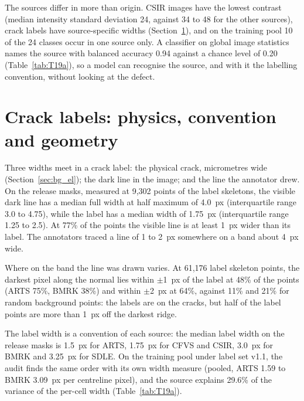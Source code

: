 The sources differ in more than origin. CSIR images have the lowest contrast (median intensity standard deviation 24,
against 34 to 48 for the other sources), crack labels have source-specific widths (Section~\ref{sec:bg_crack}), and on
the training pool 10 of the 24 classes occur in one source only. A classifier on global image statistics names the source
with balanced accuracy 0.94 against a chance level of 0.20 (Table~\ref{tab:T19a}), so a model can recognise the source,
and with it the labelling convention, without looking at the defect.


\section{Crack labels: physics, convention and geometry}\label{sec:bg_crack}

Three widths meet in a crack label: the physical crack, micrometres wide (Section~\ref{sec:bg_el}); the dark line in the
image; and the line the annotator drew. On the release masks, measured at 9,302 points of the label skeletons, the visible
dark line has a median full width at half maximum of 4.0~px (interquartile range 3.0 to 4.75), while the label has a median
width of 1.75~px (interquartile range 1.25 to 2.5). At 77\% of the points the visible line is at least 1~px wider than its
label. The annotators traced a line of 1 to 2~px somewhere on a band about 4~px wide.

Where on the band the line was drawn varies. At 61,176 label skeleton points, the darkest pixel along the normal lies within
$\pm$1~px of the label at 48\% of the points (ARTS 75\%, BMRK 38\%) and within $\pm$2~px at 64\%, against 11\% and 21\%
for random background points: the labels are on the cracks, but half of the label points are more than 1~px off the
darkest ridge.

The label width is a convention of each source: the median label width on the release masks is 1.5~px for ARTS, 1.75~px
for CFVS and CSIR, 3.0~px for BMRK and 3.25~px for SDLE. On the training pool under label set v1.1, the audit finds the
same order with its own width measure (pooled, ARTS 1.59 to BMRK 3.09~px per centreline pixel), and the source explains 29.6\% of
the variance of the per-cell width (Table~\ref{tab:T19a}).

